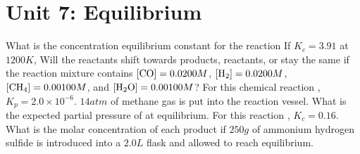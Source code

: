 \documentclass[../main.tex]{subfiles}
\begin{document}
\section{Unit 7: Equilibrium}
\ProblemSet
What is the concentration equilibrium constant for the reaction 
\ProblemSet
If \(K_c = 3.91\) at \(1200K\), Will the reactants shift towards products, reactants, or stay the same if the reaction mixture contains \([\ce{CO}] = 0.0200M\), \([\ce{H2}] = 0.0200M\), \([\ce{CH4}] = 0.00100M\), and \([\ce{H2O}] = 0.00100M\)?
\ProblemSet 
For this chemical reaction , \(K_p = 2.0\times 10^{-6}\). \(14 atm\) of methane gas is put into the reaction vessel. What is the expected partial pressure of  at equilibrium. 
\ProblemSet
For this reaction , \(K_c = 0.16\). What is the molar concentration of each product if \(250g\) of ammonium hydrogen sulfide is introduced into a \(2.0L\) flask and allowed to reach equilibrium. 
\end{document}

